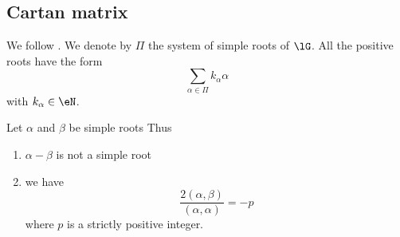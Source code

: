 \subsection{Cartan matrix}

We follow \cite{Wybourne}. We denote by $\Pi$ the system of simple roots of $\lG$. All the positive roots have the form
\begin{equation}
	\sum_{\alpha\in\Pi}k_{\alpha}\alpha
\end{equation}
with $k_{\alpha}\in\eN$.

\begin{theorem}
	Let $\alpha$ and $\beta$ be simple roots Thus
	\begin{enumerate}
		\item
		      $\alpha-\beta$ is not a simple root
		\item
		      we have
		      \begin{equation}        \label{EqabSuraaStrictNEf}
			      \frac{ 2(\alpha,\beta) }{ (\alpha,\alpha) }=-p
		      \end{equation}
		      where $p$ is a strictly positive integer.
	\end{enumerate}
\end{theorem}

